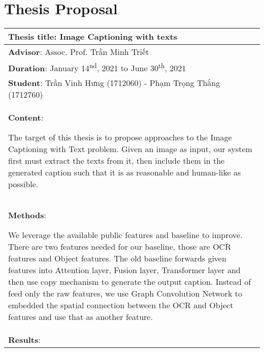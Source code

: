 \chapter{Thesis Proposal}
\begin{longtable}{|p{{{80mm}}}|c|}
\hline
\multicolumn{2}{|m{\linewidth}|}{\textbf{Thesis title}: Image Captioning with texts }\\
\hline
\multicolumn{2}{|m{\linewidth}|}{\textbf{Advisor}: Assoc. Prof. Trần Minh Triết} \\
\hline
\multicolumn{2}{|m{\linewidth}|}{\textbf{Duration}: January 14\textsuperscript{nd}, 2021 to June 30\textsuperscript{th}, 2021}\\
\hline
\multicolumn{2}{|m{\linewidth}|}{\textbf{Student}: Trần Vinh Hưng (1712060) - Phạm Trọng Thắng (1712760)}\\
\hline

\hline
\multicolumn{2}{|m{\linewidth}|}{\textbf{Content}:\par
The target of this thesis is to propose approaches to the Image Captioning with Text problem. Given an image as input, our system first must extract the texts from it, then include them in the generated caption such that it is as reasonable and human-like as possible.
}\\
\hline
\multicolumn{2}{|m{\linewidth}|}{\textbf{Methods}:\par
We leverage the available public features and baseline to improve. There are two features needed for our baseline, those are OCR features and Object features. The old baseline forwards given features into Attention layer, Fusion layer, Transformer layer and then use copy mechanism to generate the output caption. Instead of feed only the raw features, we use Graph Convolution Network to embedded the spatial connection between the OCR and Object features and use that as another feature.

}\\
\hline
\multicolumn{2}{|m{\linewidth}|}{\textbf{Results}:\par

}
\end{longtable}
